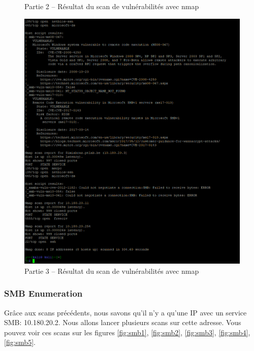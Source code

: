 \documentclass[french,paper=a4,oneside,captions=tableheading]{article}
\begin{document}
\begin{itemize}
\begin{figure}[H]
    \caption{Partie 2 -- Résultat du scan de vulnérabilités avec nmap}
    \label{fig:vuln}
\end{figure}
\begin{figure}[H]\ContinuedFloat
    \centering
    \includegraphics[width=16cm]{images/Secu_Offensive_19.png}
    \caption{Partie 3 -- Résultat du scan de vulnérabilités avec nmap}
    \label{fig:vuln}
\end{figure}

\end{itemize}



\subsubsection{SMB Enumeration}

Grâce aux scans précédents, nous savons qu'il n'y a qu'une IP avec un service SMB: 10.180.20.2. Nous allons lancer plusieurs scans sur cette adresse. Vous pouvez voir ces scans sur les figures \ref{fig:smb1}, \ref{fig:smb2}, \ref{fig:smb3}, \ref{fig:smb4}, \ref{fig:smb5}.
\end{document}

